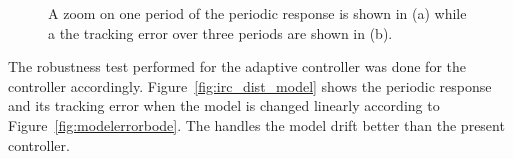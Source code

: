 \begin{figure}[h!]
  \centering %
  \qquad
  \caption{\label{fig:irc_tracking} A zoom on one period of the periodic response is shown in (a) while a the tracking error over three periods are shown in (b).}
\end{figure}

The robustness test performed for the adaptive controller was done for the \abbrIRC controller accordingly. Figure~\ref{fig:irc_dist_model} shows the periodic response and its tracking error when the model is changed linearly according to Figure~\ref{fig:modelerrorbode}. The \abbrIRC handles the model drift better than the present controller.


